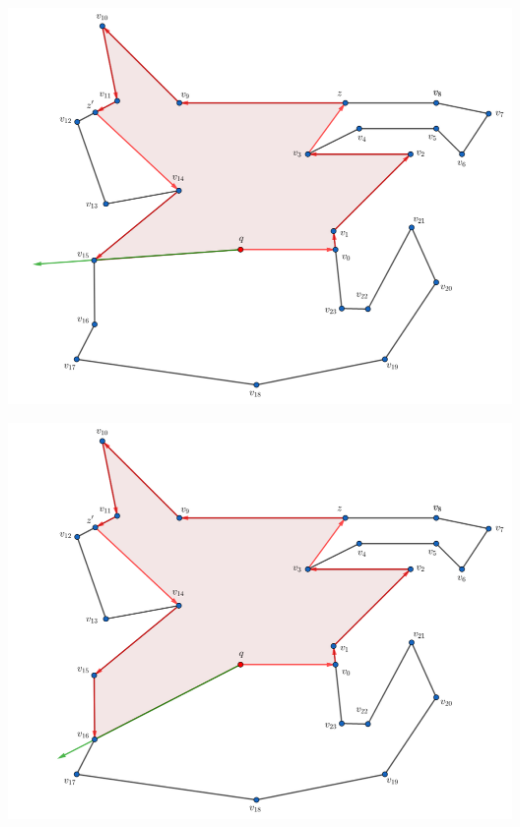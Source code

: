 \begin{frame}
  \centering \includegraphics[width=0.70 \paperwidth]{images/Ejecucion/e20.png}
\end{frame}

\begin{frame}
  \centering \includegraphics[width=0.70 \paperwidth]{images/Ejecucion/e21.png}
\end{frame}

